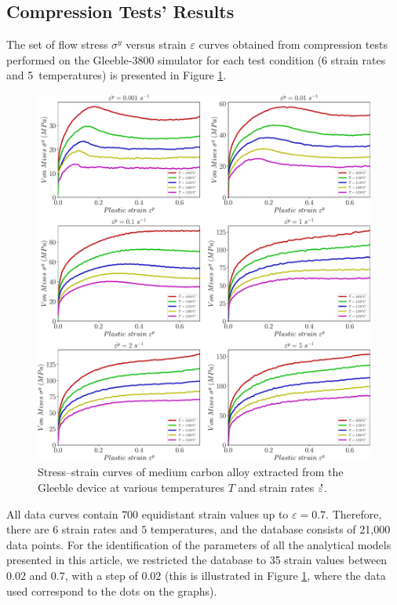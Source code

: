 \documentclass[metals,article,accept,pdftex,moreauthors]{Definitions/mdpi}
\DeclareRobustCommand{\mdot}[1]{\accentset{\mbox{\bfseries .}}{#1}}
\begin{document}
\subsection{Compression Tests' Results\label{sec:ComTestResults}}

The set of flow stress $\sigma^y$ versus strain $\varepsilon$ curves obtained from compression tests performed on the Gleeble-3800 simulator for each test condition (6 strain rates and 5~temperatures) is presented in Figure \ref{fig:RawData}.
\begin{figure}[H]

\includegraphics[width=0.99\columnwidth]{Figures/rawData}
\caption{Stress--strain curves of medium carbon alloy extracted from the Gleeble device at various temperatures $T$ and strain rates $\mdot\varepsilon$.}
\label{fig:RawData}
\end{figure}
All data curves contain $700$ equidistant strain values up to $\varepsilon=0.7$.
Therefore, there are $6$ strain rates and $5$ temperatures, and the database consists of 21,000 data points.
For the identification of the parameters of all the analytical models presented in this article, we restricted the database to 35 strain values between $0.02$ and $0.7$, with a step of $0.02$ (this is illustrated in Figure \ref{fig:RawData}, where the data used correspond to the dots on the graphs).
\end{document}
